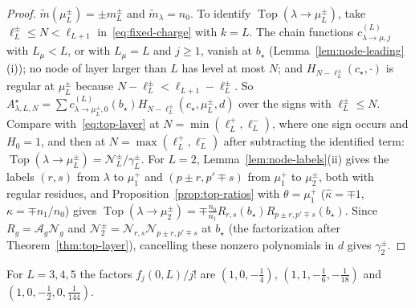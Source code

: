 \documentclass[twoside,10pt]{article}
\numberwithin{equation}{section}
\theoremstyle{slbody}
\theoremstyle{definition}
\theoremstyle{remark}
\begin{document}
\begin{proof}
$\tilde m(\mu^\pm_L)=\pm m^\pm_L$ and $\tilde m_\lambda=n_0$.  To identify
$\operatorname{Top}(\lambda\to\mu^\pm_L)$, take $\ell^\pm_L\leq N<\ell_{L+1}$
in~\eqref{eq:fixed-charge} with $k=L$.  The chain functions
$c^{(L)}_{\lambda\to\mu,j}$ with $L_\mu<L$, or with $L_\mu=L$ and $j\geq1$,
vanish at $b_\star$ (Lemma~\ref{lem:node-leading}(i)); no node of layer larger
than $L$ has level at most $N$; and $H_{N-\ell^\pm_L}(c_\star,\cdot)$ is regular
at $\mu^\pm_L$ because $N-\ell^\pm_L<\ell_{L+1}-\ell^\pm_L$.  So
$A^\star_{\lambda,L,N}=\sum c^{(L)}_{\lambda\to\mu^\pm_L,0}(b_\star)
H_{N-\ell^\pm_L}(c_\star,\mu^\pm_L,d)$ over the signs with $\ell^\pm_L\leq N$.
Compare with~\eqref{eq:top-layer} at $N=\min(\ell^+_L,\ell^-_L)$, where one sign
occurs and $H_0=1$, and then at $N=\max(\ell^+_L,\ell^-_L)$ after subtracting
the identified term: $\operatorname{Top}(\lambda\to\mu^\pm_L)=\mathcal
N^\pm_L/\gamma^\pm_L$.  For $L=2$, Lemma~\ref{lem:node-labels}(ii) gives the
labels $(r,s)$ from $\lambda$ to $\mu^+_1$ and $(p\pm r,p'\mp s)$ from $\mu^+_1$
to $\mu^\pm_2$, both with regular residues, and
Proposition~\ref{prop:top-ratios} with $\theta=\mu^+_1$
($\hat\kappa=\mp1$, $\kappa=\mp n_1/n_0$) gives
$\operatorname{Top}(\lambda\to\mu^\pm_2)=\mp\frac{n_0}{n_1}R_{r,s}(b_\star)
R_{p\pm r,p'\mp s}(b_\star)$.  Since $R_g={\mathcal A}_g{\mathcal N}_g$ and
$\mathcal N^\pm_2={\mathcal N}_{r,s}{\mathcal N}_{p\pm r,p'\mp s}$ at $b_\star$
(the factorization after Theorem~\ref{thm:top-layer}), cancelling these nonzero
polynomials in $d$ gives $\gamma^\pm_2$.
\end{proof}

For $L=3,4,5$ the factors $f_j(0,L)/j!$ are $(1,0,-\frac14)$,
$(1,1,-\frac16,-\frac1{18})$ and $(1,0,-\frac12,0,\frac1{144})$.
\end{document}
